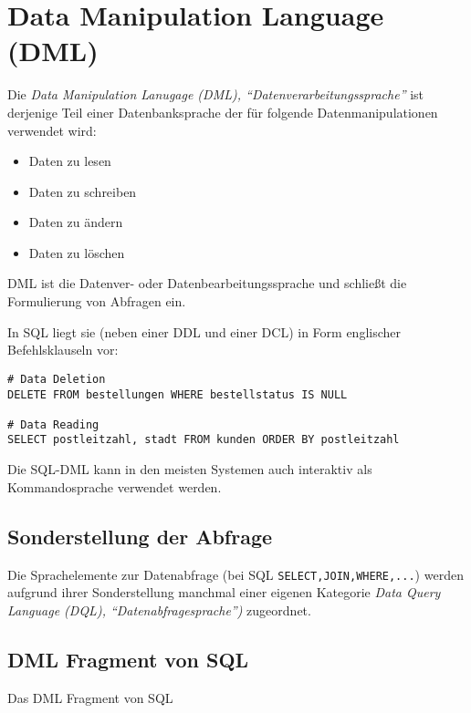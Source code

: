\documentclass{scrbook}
\begin{document}
\section{Data Manipulation Language (DML)}

Die \emph{Data Manipulation Lanugage (DML), \enquote{Datenverarbeitungssprache}} 
ist derjenige Teil einer Datenbanksprache der für folgende Datenmanipulationen verwendet wird:
\begin{itemize}
\item Daten zu lesen
\item Daten zu schreiben
\item Daten zu ändern 
\item Daten zu löschen
\end{itemize}

DML ist die Datenver- oder Datenbearbeitungssprache und schließt die Formulierung von 
Abfragen ein.

In SQL liegt sie (neben einer DDL und einer DCL) in Form englischer Befehlsklauseln vor:

\begin{lstlisting}
# Data Deletion
DELETE FROM bestellungen WHERE bestellstatus IS NULL

# Data Reading
SELECT postleitzahl, stadt FROM kunden ORDER BY postleitzahl
\end{lstlisting}

Die SQL-DML kann in den meisten Systemen auch interaktiv als Kommandosprache verwendet werden.


\subsection{Sonderstellung der Abfrage}

Die Sprachelemente zur Datenabfrage (bei SQL \lstinline{SELECT,JOIN,WHERE,...})
werden aufgrund ihrer Sonderstellung manchmal einer eigenen Kategorie 
\emph{Data Query Language (DQL), \enquote{Datenabfragesprache})} zugeordnet.


\subsection{DML Fragment von SQL}

Das DML Fragment von SQL
\end{document}
